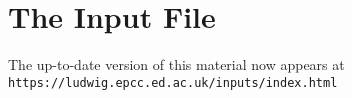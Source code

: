 %
%
%
%
%

\section{The Input File}

The up-to-date version of this material now appears at
\texttt{https://ludwig.epcc.ed.ac.uk/inputs/index.html}

\vfill
\pagebreak
